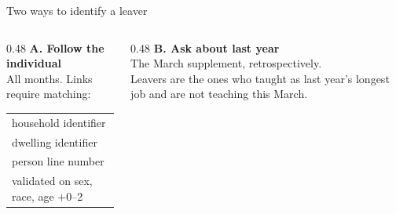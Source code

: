 \documentclass[aspectratio=169,11pt]{beamer}
\begin{document}
\begin{frame}{Two ways to identify a leaver}
  \vspace{0.6em}
  \begin{columns}[T]
    \begin{column}{0.48\textwidth}
      {\color{navy}\bfseries A. Follow the individual}\\[0.7em]
      {\small All months. Links require matching:}\\[0.5em]
      {\small
      \begin{tabular}{@{}l@{}}
        household identifier\\
        dwelling identifier\\
        person line number\\[0.35em]
        \color{mut}validated on sex, race, age $+$0--2
      \end{tabular}}
    \end{column}
    \begin{column}{0.48\textwidth}
      {\color{navy}\bfseries B. Ask about last year}\\[0.7em]
      {\small The March supplement, retrospectively.}\\[0.5em]
      {\small Leavers are the ones who taught as last year's longest job
       and are not teaching this March.}
    \end{column}
  \end{columns}
\end{frame}
\end{document}
